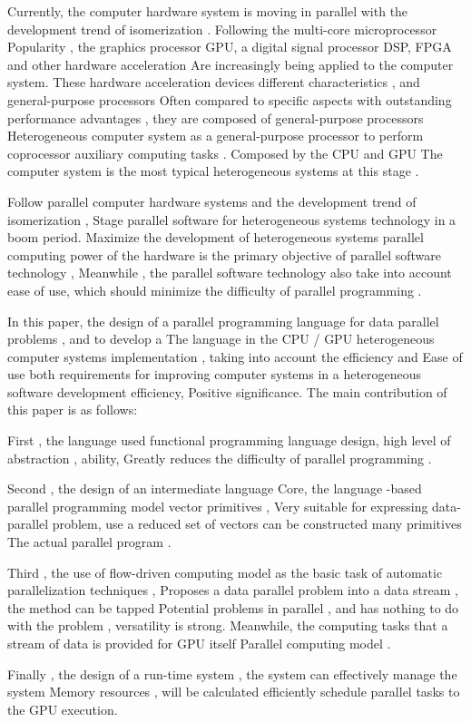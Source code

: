 \begin{eabstract}
Currently, the computer hardware system is moving in parallel with the development trend of isomerization . Following the multi-core microprocessor
Popularity , the graphics processor GPU, a digital signal processor DSP, FPGA and other hardware acceleration
Are increasingly being applied to the computer system. These hardware acceleration devices different characteristics , and general-purpose processors
Often compared to specific aspects with outstanding performance advantages , they are composed of general-purpose processors
Heterogeneous computer system as a general-purpose processor to perform coprocessor auxiliary computing tasks . Composed by the CPU and GPU
The computer system is the most typical heterogeneous systems at this stage .

Follow parallel computer hardware systems and the development trend of isomerization ,
Stage parallel software for heterogeneous systems technology in a boom period.
Maximize the development of heterogeneous systems parallel computing power of the hardware is the primary objective of parallel software technology ,
Meanwhile , the parallel software technology also take into account ease of use, which should minimize the difficulty of parallel programming .

In this paper, the design of a parallel programming language for data parallel problems , and to develop a
The language in the CPU / GPU heterogeneous computer systems implementation , taking into account the efficiency and
Ease of use both requirements for improving computer systems in a heterogeneous software development efficiency,
Positive significance. The main contribution of this paper is as follows:

First , the language used functional programming language design, high level of abstraction , ability,
Greatly reduces the difficulty of parallel programming .

Second , the design of an intermediate language Core, the language -based parallel programming model vector primitives ,
Very suitable for expressing data-parallel problem, use a reduced set of vectors can be constructed many primitives
The actual parallel program .

Third , the use of flow-driven computing model as the basic task of automatic parallelization techniques ,
Proposes a data parallel problem into a data stream , the method can be tapped
Potential problems in parallel , and has nothing to do with the problem , versatility is strong.
Meanwhile, the computing tasks that a stream of data is provided for GPU itself
Parallel computing model .

Finally , the design of a run-time system , the system can effectively manage the system
Memory resources , will be calculated efficiently schedule parallel tasks to the GPU execution.
\end{eabstract}


